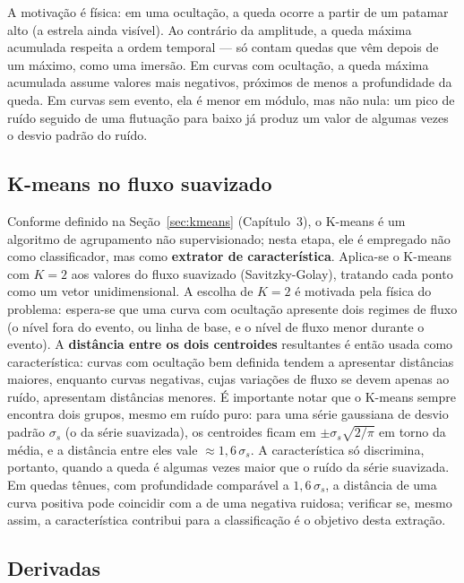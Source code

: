 A motivação é física: em uma ocultação, a queda ocorre a partir de um patamar alto (a estrela ainda visível). Ao contrário da amplitude, a queda máxima acumulada respeita a ordem temporal --- só contam quedas que vêm depois de um máximo, como uma imersão. Em curvas com ocultação, a queda máxima acumulada assume valores mais negativos, próximos de menos a profundidade da queda. Em curvas sem evento, ela é menor em módulo, mas não nula: um pico de ruído seguido de uma flutuação para baixo já produz um valor de algumas vezes o desvio padrão do ruído.

\subsection{K-means no fluxo suavizado}

Conforme definido na Seção~\ref{sec:kmeans} (Capítulo~3), o K-means é um algoritmo de agrupamento não supervisionado; nesta etapa, ele é empregado não como classificador, mas como \textbf{extrator de característica}. Aplica-se o K-means com \(K=2\) aos valores do fluxo suavizado (Savitzky-Golay), tratando cada ponto como um vetor unidimensional. A escolha de \(K=2\) é motivada pela física do problema: espera-se que uma curva com ocultação apresente dois regimes de fluxo (o nível fora do evento, ou linha de base, e o nível de fluxo menor durante o evento). A \textbf{distância entre os dois centroides} resultantes é então usada como característica: curvas com ocultação bem definida tendem a apresentar distâncias maiores, enquanto curvas negativas, cujas variações de fluxo se devem apenas ao ruído, apresentam distâncias menores. É importante notar que o K-means sempre encontra dois grupos, mesmo em ruído puro: para uma série gaussiana de desvio padrão \(\sigma_s\) (o da série suavizada), os centroides ficam em \(\pm\sigma_s\sqrt{2/\pi}\) em torno da média, e a distância entre eles vale \(\approx 1{,}6\,\sigma_s\). A característica só discrimina, portanto, quando a queda é algumas vezes maior que o ruído da série suavizada. Em quedas tênues, com profundidade comparável a \(1{,}6\,\sigma_s\), a distância de uma curva positiva pode coincidir com a de uma negativa ruidosa; verificar se, mesmo assim, a característica contribui para a classificação é o objetivo desta extração.

\subsection{Derivadas}

